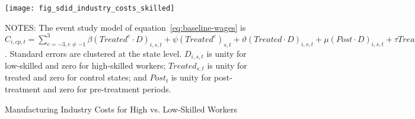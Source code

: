 \begin{figure}[H]
    \centering
    \texttt{[image: fig\_sdid\_industry\_costs\_skilled]}
    \caption{Manufacturing Industry Costs for High vs. Low-Skilled Workers}
    \label{fig:baseline-manufacturing-industry-costs-skilled}
    \begin{minipage}{\columnwidth}
        \vspace{0.05in}
        \tiny NOTES: The event study model of equation~\ref{eq:baseline-wages} is $C_{i,cp,t} = \sum_{{e = -3},{e \neq -1}}^{3} \beta (Treated^{e} \cdot D)_{i,s,t} + \psi (Treated^{e})_{s,t} + \vartheta (Treated \cdot D)_{i,s,t} + \mu (Post \cdot D)_{i,s,t} + \tau Treated_{s,t} + \rho D_{i,s,t} + \alpha Post_{t} + \delta X_{v,c,t-1} + \omega F_{f,t} + \lambda_{t} + \sigma_{c} + \phi_{cp} + \zeta_{cp,t} + \epsilon_{i,cp,t}$. Standard errors are clustered at the state level. $D_{i,s,t}$ is unity for low-skilled and zero for high-skilled workers; $Treated_{s,t}$ is unity for treated and zero for control states; and $Post_{t}$ is unity for post-treatment and zero for pre-treatment periods.
    \end{minipage}
\end{figure}